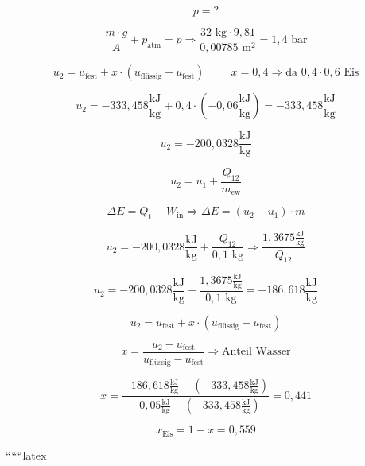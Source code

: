 \[
p = ?
\]

\[
\frac{m \cdot g}{A} + p_{\text{atm}} = p \Rightarrow \frac{32 \text{ kg} \cdot 9,81}{0,00785 \text{ m}^2} = 1,4 \text{ bar}
\]

\[
u_2 = u_{\text{fest}} + x \cdot (u_{\text{flüssig}} - u_{\text{fest}}) \hspace{1cm} x = 0,4 \Rightarrow \text{da } 0,4 \cdot 0,6 \text{ Eis}
\]

\[
u_2 = -333,458 \frac{\text{kJ}}{\text{kg}} + 0,4 \cdot (-0,06 \frac{\text{kJ}}{\text{kg}}) = -333,458 \frac{\text{kJ}}{\text{kg}}
\]

\[
u_2 = -200,0328 \frac{\text{kJ}}{\text{kg}}
\]

\[
u_2 = u_1 + \frac{Q_{12}}{m_{\text{ew}}}
\]

\[
\Delta E = Q_{1} - W_{\text{in}} \Rightarrow \Delta E = (u_2 - u_1) \cdot m
\]

\[
u_2 = -200,0328 \frac{\text{kJ}}{\text{kg}} + \frac{Q_{12}}{0,1 \text{ kg}} \Rightarrow \frac{1,3675 \frac{\text{kJ}}{\text{kg}}}{Q_{12}}
\]

\[
u_2 = -200,0328 \frac{\text{kJ}}{\text{kg}} + \frac{1,3675 \frac{\text{kJ}}{\text{kg}}}{0,1 \text{ kg}} = -186,618 \frac{\text{kJ}}{\text{kg}}
\]

\[
u_2 = u_{\text{fest}} + x \cdot (u_{\text{flüssig}} - u_{\text{fest}})
\]

\[
x = \frac{u_2 - u_{\text{fest}}}{u_{\text{flüssig}} - u_{\text{fest}}} \Rightarrow \text{Anteil Wasser}
\]

\[
x = \frac{-186,618 \frac{\text{kJ}}{\text{kg}} - (-333,458 \frac{\text{kJ}}{\text{kg}})}{-0,05 \frac{\text{kJ}}{\text{kg}} - (-333,458 \frac{\text{kJ}}{\text{kg}})} = 0,441
\]

\[
x_{\text{Eis}} = 1 - x = 0,559
\]

``````latex


